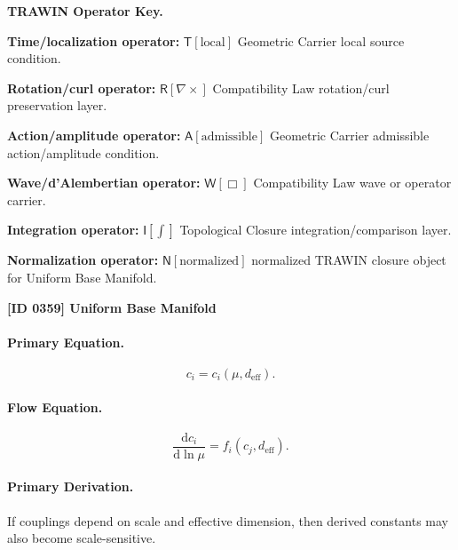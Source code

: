 \par\vspace{0.45\baselineskip}
\noindent\begin{minipage}[t]{\linewidth}
\begingroup
\small
\raggedright
\textbf{TRAWIN Operator Key.}\par
\noindent\textbf{Time/localization operator:} $\mathsf{T}\!\left[\mathrm{local}\right]$ Geometric Carrier local source condition.\par
\noindent\textbf{Rotation/curl operator:} $\mathsf{R}\!\left[\nabla\times\right]$ Compatibility Law rotation/curl preservation layer.\par
\noindent\textbf{Action/amplitude operator:} $\mathsf{A}\!\left[\mathrm{admissible}\right]$ Geometric Carrier admissible action/amplitude condition.\par
\noindent\textbf{Wave/d'Alembertian operator:} $\mathsf{W}\!\left[\Box\right]$ Compatibility Law wave or operator carrier.\par
\noindent\textbf{Integration operator:} $\mathsf{I}\!\left[\int\right]$ Topological Closure integration/comparison layer.\par
\noindent\textbf{Normalization operator:} $\mathsf{N}\!\left[\mathrm{normalized}\right]$ normalized TRAWIN closure object for Uniform Base Manifold.\par
\endgroup
\end{minipage}

\clearpage
\noindent\textbf{[ID 0359] Uniform Base Manifold}\par
\vspace{0.35em}
\paragraph{Primary Equation.}
\begin{equation}
c_i=c_i(\mu,d_{\mathrm{eff}}).
\end{equation}

\paragraph{Flow Equation.}
\begin{equation}
\frac{\mathrm{d}c_i}{\mathrm{d}\ln\mu}
=
f_i(c_j,d_{\mathrm{eff}}).
\end{equation}

\paragraph{Primary Derivation.}
If couplings depend on scale and effective dimension, then derived constants may also become scale-sensitive.

